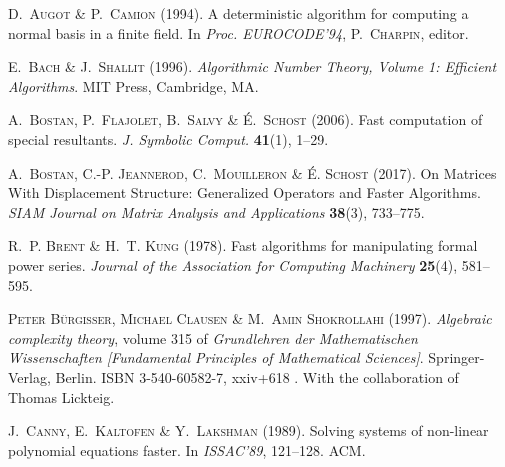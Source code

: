 \newcommand{\Gathen}{\relax}
\begin{thebibliography}{36}
\providecommand{\natexlab}[1]{#1}
\providecommand{\url}[1]{\texttt{#1}}
\providecommand{\urlprefix}{URL }
\providecommand{\selectlanguage}[1]{\relax}

\textsc{D.~Augot} \& \textsc{P.~Camion} (1994).
\newblock A deterministic algorithm for computing a normal basis in a finite
  field.
\newblock In \emph{Proc. EUROCODE'94}, \textsc{P.~Charpin}, editor.

\textsc{E.~Bach} \& \textsc{J.~Shallit} (1996).
\newblock \emph{Algorithmic Number Theory, Volume 1: Efficient Algorithms}.
\newblock MIT Press, Cambridge, MA.

\textsc{A.~Bostan}, \textsc{P.~Flajolet}, \textsc{B.~Salvy} \&
  \textsc{{\'E}.~Schost} (2006).
\newblock Fast computation of special resultants.
\newblock \emph{J. Symbolic Comput.} \textbf{41}(1), 1--29.

\textsc{A.~Bostan}, \textsc{C.-P. Jeannerod}, \textsc{C.~Mouilleron} \&
  \textsc{\'E. Schost} (2017).
\newblock On Matrices With Displacement Structure: Generalized Operators and
  Faster Algorithms.
\newblock \emph{SIAM Journal on Matrix Analysis and Applications}
  \textbf{38}(3), 733--775.

\textsc{R.~P. Brent} \& \textsc{H.~T. Kung} (1978).
\newblock Fast algorithms for manipulating formal power series.
\newblock \emph{Journal of the Association for Computing Machinery}
  \textbf{25}(4), 581--595.

\textsc{Peter B\"{u}rgisser}, \textsc{Michael Clausen} \& \textsc{M.~Amin
  Shokrollahi} (1997).
\newblock \emph{Algebraic complexity theory}, volume 315 of \emph{Grundlehren
  der Mathematischen Wissenschaften [Fundamental Principles of Mathematical
  Sciences]}.
\newblock Springer-Verlag, Berlin.
\newblock ISBN 3-540-60582-7, xxiv+618 .
\newblock With the collaboration of Thomas Lickteig.

\textsc{J.~Canny}, \textsc{E.~Kaltofen} \& \textsc{Y.~Lakshman} (1989).
\newblock Solving systems of non-linear polynomial equations faster.
\newblock In \emph{ISSAC'89}, 121--128. ACM.


\end{thebibliography}
